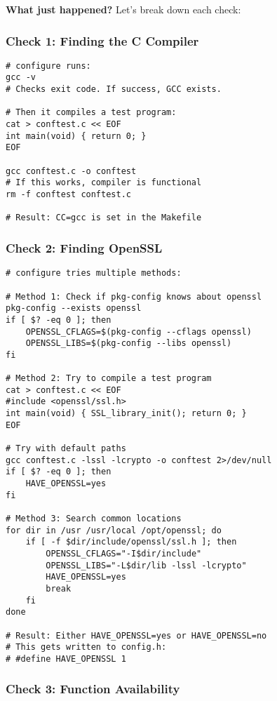 \textbf{What just happened?} Let's break down each check:

\subsubsection{Check 1: Finding the C Compiler}

\begin{lstlisting}
# configure runs:
gcc -v
# Checks exit code. If success, GCC exists.

# Then it compiles a test program:
cat > conftest.c << EOF
int main(void) { return 0; }
EOF

gcc conftest.c -o conftest
# If this works, compiler is functional
rm -f conftest conftest.c

# Result: CC=gcc is set in the Makefile
\end{lstlisting}

\subsubsection{Check 2: Finding OpenSSL}

\begin{lstlisting}
# configure tries multiple methods:

# Method 1: Check if pkg-config knows about openssl
pkg-config --exists openssl
if [ $? -eq 0 ]; then
    OPENSSL_CFLAGS=$(pkg-config --cflags openssl)
    OPENSSL_LIBS=$(pkg-config --libs openssl)
fi

# Method 2: Try to compile a test program
cat > conftest.c << EOF
#include <openssl/ssl.h>
int main(void) { SSL_library_init(); return 0; }
EOF

# Try with default paths
gcc conftest.c -lssl -lcrypto -o conftest 2>/dev/null
if [ $? -eq 0 ]; then
    HAVE_OPENSSL=yes
fi

# Method 3: Search common locations
for dir in /usr /usr/local /opt/openssl; do
    if [ -f $dir/include/openssl/ssl.h ]; then
        OPENSSL_CFLAGS="-I$dir/include"
        OPENSSL_LIBS="-L$dir/lib -lssl -lcrypto"
        HAVE_OPENSSL=yes
        break
    fi
done

# Result: Either HAVE_OPENSSL=yes or HAVE_OPENSSL=no
# This gets written to config.h:
# #define HAVE_OPENSSL 1
\end{lstlisting}

\subsubsection{Check 3: Function Availability}

